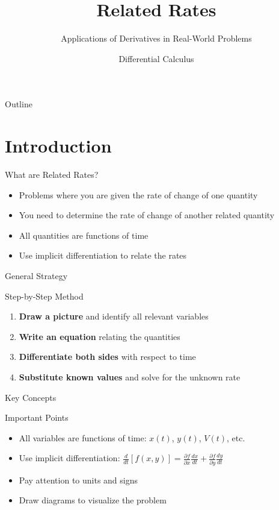 \documentclass[aspectratio=169]{beamer}
\title{Related Rates}
\subtitle{Applications of Derivatives in Real-World Problems}
\author{Differential Calculus}
\date{}
\begin{document}
\begin{frame}
\titlepage
\end{frame}

\begin{frame}{Outline}
\tableofcontents
\end{frame}

\section{Introduction}

\begin{frame}{What are Related Rates?}
\begin{itemize}
  \item Problems where you are given the rate of change of one quantity
  \item You need to determine the rate of change of another related quantity
  \item All quantities are functions of time
  \item Use implicit differentiation to relate the rates
\end{itemize}
\end{frame}

\begin{frame}{General Strategy}
\begin{block}{Step-by-Step Method}
\begin{enumerate}
  \item \textbf{Draw a picture} and identify all relevant variables
  \item \textbf{Write an equation} relating the quantities
  \item \textbf{Differentiate both sides} with respect to time
  \item \textbf{Substitute known values} and solve for the unknown rate
\end{enumerate}
\end{block}
\end{frame}

\begin{frame}{Key Concepts}
\begin{block}{Important Points}
\begin{itemize}
  \item All variables are functions of time: $x(t)$, $y(t)$, $V(t)$, etc.
  \item Use implicit differentiation: $\frac{d}{dt}[f(x,y)] = \frac{\partial f}{\partial x}\frac{dx}{dt} + \frac{\partial f}{\partial y}\frac{dy}{dt}$
  \item Pay attention to units and signs
  \item Draw diagrams to visualize the problem
\end{itemize}
\end{block}
\end{frame}
\end{document}
